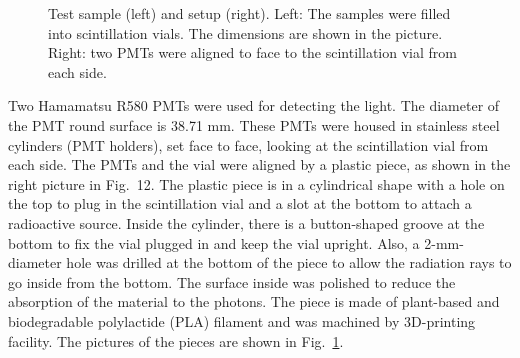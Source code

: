 \begin{figure}[htbp]
	\caption{Test sample (left) and setup (right). Left: The samples were filled into scintillation vials. The dimensions are shown in the picture. Right: two PMTs were aligned to face to the scintillation vial from each side.}
	\label{scintVial}
\end{figure}

Two Hamamatsu R580 PMTs \cite{pmtR580} were used for detecting the light. The diameter of the PMT round surface is 38.71 mm. These PMTs were housed in stainless steel cylinders (PMT holders), set face to face, looking at the scintillation vial from each side. The PMTs and the vial were aligned by a plastic piece, as shown in the right picture in Fig.~12.  The plastic piece is in a cylindrical shape with a hole on the top to plug in the scintillation vial and a slot at the bottom to attach a radioactive source. Inside the cylinder, there is a button-shaped groove at the bottom to fix the vial plugged in and keep the vial upright. Also, a 2-mm-diameter hole was drilled at the bottom of the piece to allow the radiation rays to go inside from the bottom. The surface inside was polished to reduce the absorption of the material to the photons. The piece is made of plant-based and biodegradable polylactide (PLA) filament and was machined by 3D-printing facility. The pictures of the pieces are shown in Fig.~\ref{scintVial}.

